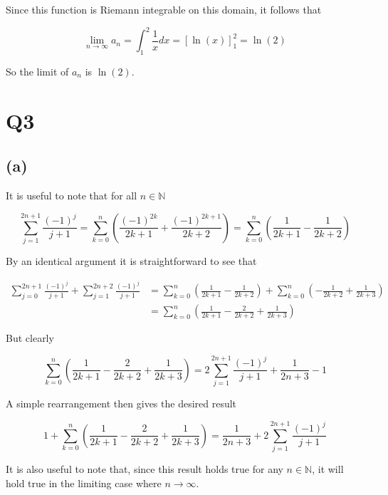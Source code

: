 \documentclass{article}
\begin{document}
Since this function is Riemann integrable on this domain, it follows that 

\begin{equation*}
    \lim_{n \rightarrow \infty} a_n = \int_1^2\frac{1}{x}dx = \left[\ln(x)\right]_1^2=\ln(2)
\end{equation*}

So the limit of $a_n$ is $\ln(2)$.

\section*{Q3}
\subsection*{(a)}
It is useful to note that for all $n \in \mathbb{N}$

\begin{equation*}
    \sum_{j=1}^{2n+1}\frac{(-1)^j}{j+1} = \sum^n_{k=0}\left(\frac{(-1)^{2k}}{2k+1} + \frac{(-1)^{2k+1}}{2k+2}\right) = \sum^n_{k=0}\left(\frac{1}{2k+1} - \frac{1}{2k+2}\right)
\end{equation*}

By an identical argument it is straightforward to see that 

\begin{align*}
    \sum_{j=0}^{2n+1}\frac{(-1)^j}{j+1} + \sum_{j=1}^{2n+2}\frac{(-1)^j}{j+1} &= \sum_{k=0}^n\left(\frac{1}{2k+1}-\frac{1}{2k+2}\right) + \sum_{k=0}^{n}\left(-\frac{1}{2k+2} + \frac{1}{2k+3}\right) \\
    &= \sum_{k=0}^n\left(\frac{1}{2k+1} - \frac{2}{2k+2} + \frac{1}{2k+3}\right)
\end{align*}

But clearly 

\begin{equation*}
    \sum_{k=0}^n\left(\frac{1}{2k+1} - \frac{2}{2k+2} + \frac{1}{2k+3}\right) = 2\sum_{j=1}^{2n+1}\frac{(-1)^j}{j+1} + \frac{1}{2n+3} -1
\end{equation*}

A simple rearrangement then gives the desired result 

\begin{equation*}
    1+ \sum_{k=0}^n\left(\frac{1}{2k+1} - \frac{2}{2k+2} + \frac{1}{2k+3}\right) = \frac{1}{2n+3}+ 2\sum_{j=1}^{2n+1}\frac{(-1)^j}{j+1}
\end{equation*}

It is also useful to note that, since this result holds true for any $n \in \mathbb{N}$, it 
will hold true in the limiting case where $n \rightarrow \infty$.
\end{document}
